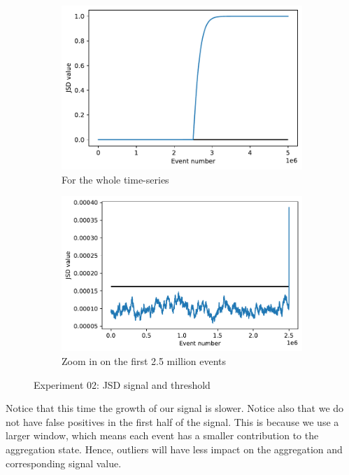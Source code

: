 \begin{figure}[!htb]
\centering
\begin{subfigure}{.5\textwidth}
  \centering
  \includegraphics[width=1\linewidth]{figures/stream-analysis-viz-62500.pdf}
  \caption{For the whole time-series}
  \label{fig:JSD-signal-02}
\end{subfigure}%
\begin{subfigure}{.5\textwidth}
  \centering
  \includegraphics[width=1\linewidth]{figures/stream-analysis-viz-zoom-62500.pdf}
  \caption{Zoom in on the first 2.5 million events}
  \label{fig:JSD-signal-zoom-02}
\end{subfigure}
\caption{Experiment 02: JSD signal and threshold}
\end{figure}
Notice that this time the growth of our signal is slower. Notice also that we do not have false positives in the first half of the signal. This is because we use a larger window, which means each event has a smaller contribution to the aggregation state. Hence, outliers will have less impact on the aggregation and corresponding signal value.

